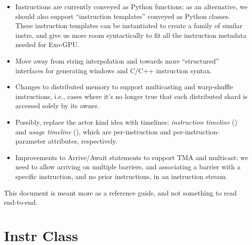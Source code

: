 \begin{itemize}
\item Instructions are currently conveyed as Python functions; as an alternative, we should also support ``instruction templates'' conveyed as Python classes.
These instruction templates can be instantiated to create a family of similar instrs, and give us more room syntactically to fit all the instruction metadata needed for Exo-GPU.
\item Move away from string interpolation and towards more ``structured'' interfaces for generating windows and C/C++ instruction syntax.
\item Changes to distributed memory to support multicasting and warp-shuffle instructions, i.e., cases where it's no longer true that each distributed shard is accessed solely by its owner.
\item Possibly, replace the actor kind idea with timelines: \textit{instruction timeline} () and \textit{usage timeline} (), which are per-instruction and per-instruction-parameter attributes, respectively.
\item Improvements to Arrive/Await statements to support TMA and multicast: we need to allow arriving on multiple barriers, and associating a barrier with a specific instruction, and no prior instructions, in an instruction stream.
\end{itemize}

\filbreak
{}

This document is meant more as a reference guide, and not something to read end-to-end.

{\sffamily
{}








}

\newpage
\section{Instr Class}
\label{ch:InstrClass}


